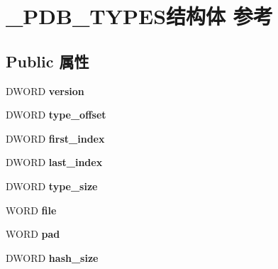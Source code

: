 \hypertarget{struct___p_d_b___t_y_p_e_s}{}\section{\+\_\+\+P\+D\+B\+\_\+\+T\+Y\+P\+E\+S结构体 参考}
\label{struct___p_d_b___t_y_p_e_s}
\subsection*{Public 属性}
\begin{DoxyCompactItemize}
\item 
\mbox{\label{struct___p_d_b___t_y_p_e_s_a40fb933af38ae9ddf29cbdc5994be63b}} 
D\+W\+O\+RD {\bfseries version}
\item 
\mbox{\label{struct___p_d_b___t_y_p_e_s_a3a39a7b58132f2d5a23b73d32bb6688a}} 
D\+W\+O\+RD {\bfseries type\+\_\+offset}
\item 
\mbox{\label{struct___p_d_b___t_y_p_e_s_acc04b8e75acb3bc52145ad095a7fdccd}} 
D\+W\+O\+RD {\bfseries first\+\_\+index}
\item 
\mbox{\label{struct___p_d_b___t_y_p_e_s_a6d7013a93d7fdf29f2f82efa5e7e3574}} 
D\+W\+O\+RD {\bfseries last\+\_\+index}
\item 
\mbox{\label{struct___p_d_b___t_y_p_e_s_adeae13d35cbe5ae8fb1a699daf5507ec}} 
D\+W\+O\+RD {\bfseries type\+\_\+size}
\item 
\mbox{\label{struct___p_d_b___t_y_p_e_s_a90cea3c38be33b24454fa1f529322cdd}} 
W\+O\+RD {\bfseries file}
\item 
\mbox{\label{struct___p_d_b___t_y_p_e_s_a5a91357ce40663c11b1b2fa719ab4ac2}} 
W\+O\+RD {\bfseries pad}
\item 
\mbox{\label{struct___p_d_b___t_y_p_e_s_ab0b0017b71772e0b4316a5c9e5ff1448}} 
D\+W\+O\+RD {\bfseries hash\+\_\+size}
\item 
\mbox{\label{struct___p_d_b___t_y_p_e_s_a00ce95e95b7641141c0f018fd45aba9d}} 

\end{DoxyCompactItemize}
